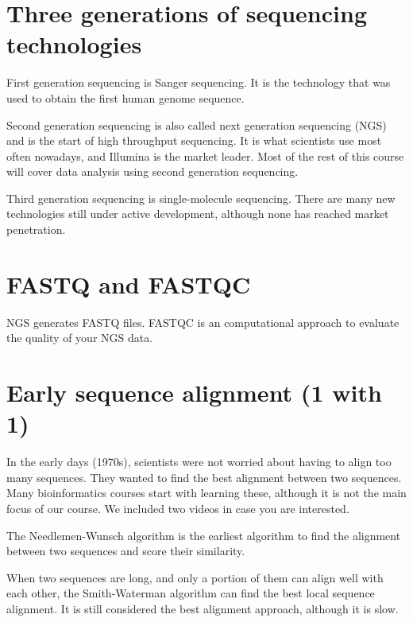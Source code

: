 \documentclass[
]{book}
\begin{document}
\hypertarget{three-generations-of-sequencing-technologies}{%
\section{Three generations of sequencing technologies}\label{three-generations-of-sequencing-technologies}}

First generation sequencing is Sanger sequencing. It is the technology that was used to obtain the first human genome sequence.

Second generation sequencing is also called next generation sequencing (NGS) and is the start of high throughput sequencing. It is what scientists use most often nowadays, and Illumina is the market leader. Most of the rest of this course will cover data analysis using second generation sequencing.

Third generation sequencing is single-molecule sequencing. There are many new technologies still under active development, although none has reached market penetration.

\hypertarget{fastq-and-fastqc}{%
\section{FASTQ and FASTQC}\label{fastq-and-fastqc}}

NGS generates FASTQ files. FASTQC is an computational approach to evaluate the quality of your NGS data.

\hypertarget{early-sequence-alignment-1-with-1}{%
\section{Early sequence alignment (1 with 1)}\label{early-sequence-alignment-1-with-1}}

In the early days (1970s), scientists were not worried about having to align too many sequences. They wanted to find the best alignment between two sequences. Many bioinformatics courses start with learning these, although it is not the main focus of our course. We included two videos in case you are interested.

The Needlemen-Wunsch algorithm is the earliest algorithm to find the alignment between two sequences and score their similarity.

When two sequences are long, and only a portion of them can align well with each other, the Smith-Waterman algorithm can find the best local sequence alignment. It is still considered the best alignment approach, although it is slow.
\end{document}
